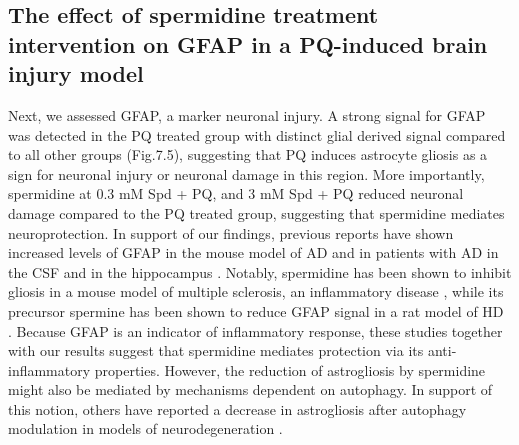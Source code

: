 \subsection{The effect of spermidine treatment intervention on GFAP in a PQ-induced brain injury model}
Next, we assessed GFAP, a marker neuronal injury. A strong signal for GFAP was detected in the PQ treated group with distinct glial derived signal compared to all other groups (Fig.7.5), suggesting that PQ induces astrocyte gliosis as a sign for neuronal injury or neuronal damage in this region. More importantly, spermidine at 0.3 mM Spd + PQ, and 3 mM Spd + PQ reduced neuronal damage compared to the PQ treated group, suggesting that spermidine mediates neuroprotection. In support of our findings, previous reports have shown increased levels of GFAP in the mouse model of AD \citep{Kamphuis2014,Kamphuis2012} and in patients with AD in the CSF \citep{Colangelo2014,Fukuyama2001,Ishiki2016} and in the hippocampus \citep{Kamphuis2014}. Notably, spermidine has been shown to inhibit gliosis in a mouse model of multiple sclerosis, an inflammatory disease \citep{Guo2011}, while its precursor spermine has been shown to reduce GFAP signal in a rat model of HD \citep{Velloso2009}. Because GFAP is an indicator of inflammatory response, these studies together with our results suggest that spermidine mediates protection via its anti-inflammatory properties. However, the reduction of astrogliosis by spermidine might also be mediated by mechanisms dependent on autophagy. In support of this notion, others have reported a decrease in astrogliosis after autophagy modulation in models of neurodegeneration \citep{Castillo2013,Rodriguez-Navarro2010,Wang2012}. 
